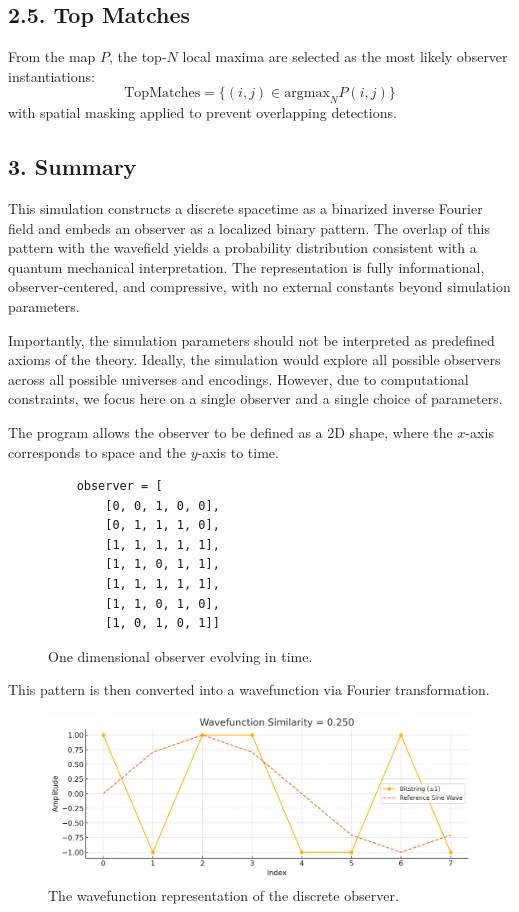 \documentclass[11pt]{article}
\begin{document}
\subsection*{2.5. Top Matches}

From the map $P$, the top-$N$ local maxima are selected as the most likely observer instantiations:
\[
    \text{TopMatches} = \{(i,j) \in \text{argmax}_N P(i,j)\}
\]
with spatial masking applied to prevent overlapping detections.

\subsection*{3. Summary}

This simulation constructs a discrete spacetime as a binarized inverse Fourier field and embeds an observer as a localized binary pattern. The overlap of this pattern with the wavefield yields a probability distribution consistent with a quantum mechanical interpretation. The representation is fully informational, observer-centered, and compressive, with no external constants beyond simulation parameters.

Importantly, the simulation parameters should not be interpreted as predefined axioms of the theory. Ideally, the simulation would explore all possible observers across all possible universes and encodings. However, due to computational constraints, we focus here on a single observer and a single choice of parameters.

The program allows the observer to be defined as a 2D shape, where the $x$-axis corresponds to space and the $y$-axis to time.

\begin{figure}[ht]
    \centering
    \begin{minipage}{0.8\textwidth}
        \begin{verbatim}
    observer = [
        [0, 0, 1, 0, 0],
        [0, 1, 1, 1, 0],
        [1, 1, 1, 1, 1],
        [1, 1, 0, 1, 1],
        [1, 1, 1, 1, 1],
        [1, 1, 0, 1, 0],
        [1, 0, 1, 0, 1]]
  \end{verbatim}
    \end{minipage}
    \caption{One dimensional observer evolving in time. }
\end{figure}

This pattern is then converted into a wavefunction via Fourier transformation.

\begin{figure}[h!]
    \centering
    \includegraphics[width=1.0\textwidth]{figures/wavefunction_similarity.png}
    \caption{The wavefunction representation of the discrete observer.}
    \label{fig:wavefunction_similarity}
\end{figure}
\end{document}
